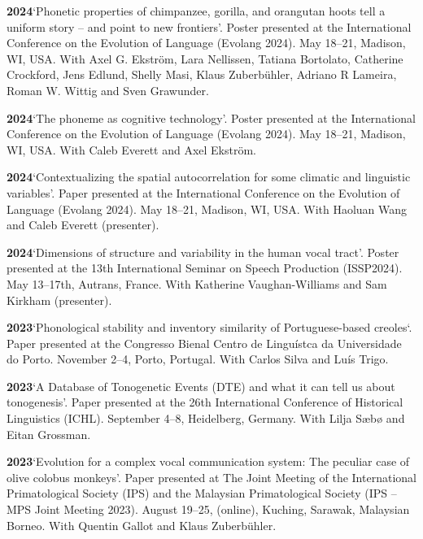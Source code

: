 \documentclass[11pt]{article}
\newcommand{\hangpara}{
 \setlength{\parindent}{0in} %
 \hangindent=0.42in %
}
\begin{document}
\hangpara
\vskip 6pt
{\bf 2024}\hspace{1ex}`Phonetic properties of chimpanzee, gorilla, and orangutan hoots tell a uniform story – and point to new frontiers'. Poster presented at the International Conference on the Evolution of Language (Evolang 2024). May 18--21, Madison, WI, USA. With  Axel G. Ekström, Lara Nellissen, Tatiana Bortolato, Catherine Crockford, Jens Edlund, Shelly Masi, Klaus Zuberbühler, Adriano R Lameira, Roman W. Wittig and Sven Grawunder.

\hangpara
\vskip 6pt
{\bf 2024}\hspace{1ex}`The phoneme as cognitive technology'. Poster presented at the International Conference on the Evolution of Language (Evolang 2024). May 18--21, Madison, WI, USA. With Caleb Everett and Axel Ekström.

\hangpara
\vskip 6pt
{\bf 2024}\hspace{1ex}`Contextualizing the spatial autocorrelation for some climatic and linguistic variables'. Paper presented at the International Conference on the Evolution of Language (Evolang 2024). May 18--21, Madison, WI, USA. With Haoluan Wang and Caleb Everett (presenter).

\hangpara
\vskip 6pt
{\bf 2024}\hspace{1ex}`Dimensions of structure and variability in the human vocal tract'. Poster presented at the 13th International Seminar on Speech Production (ISSP2024). May 13--17th, Autrans, France. With Katherine Vaughan-Williams and Sam Kirkham (presenter).

\hangpara
\vskip 6pt
{\bf 2023}\hspace{1ex}`Phonological stability and inventory similarity of Portuguese-based creoles`. Paper presented at the Congresso Bienal Centro de Linguístca da Universidade do Porto. November 2--4, Porto, Portugal. With Carlos Silva and Luís Trigo. %

\hangpara
\vskip 6pt
{\bf 2023}\hspace{1ex}`A Database of Tonogenetic Events (DTE) and what it can tell us about tonogenesis'. Paper presented at the 26th International Conference of Historical Linguistics (ICHL). September 4--8, Heidelberg, Germany. With Lilja Sæbø and Eitan Grossman.

\hangpara
\vskip 6pt
{\bf 2023}\hspace{1ex}`Evolution for a complex vocal communication system: The peculiar case of olive colobus monkeys'. Paper presented at The Joint Meeting of the International Primatological Society (IPS) and the Malaysian Primatological Society (IPS – MPS Joint Meeting 2023). August 19--25, (online), Kuching, Sarawak, Malaysian Borneo. With Quentin Gallot and Klaus Zuberbühler.
\end{document}
